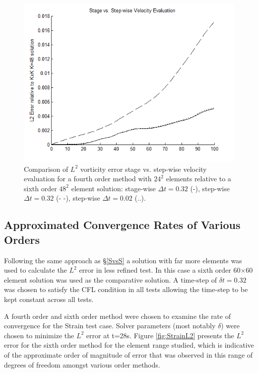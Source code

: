 \documentclass[letterpaper,12pt]{report}
\begin{document}
\begin{figure}
\centering
\includegraphics[width=1\textwidth]{StrainStageVSStep.PNG}
\caption{\label{fig:StrainStageVSStep}Comparison of $L^2$ vorticity error stage vs. step-wise velocity evaluation for a fourth order method with $24^2$ elements relative to a sixth order $48^2$ element solution: stage-wise $\Delta t=0.32$ (-), step-wise $\Delta t=0.32$ (- -), step-wise $\Delta t=0.02$ (..). }
\end{figure}
%
\subsection{Approximated Convergence Rates of Various Orders}\label{SConverge}
Following the same approach as \S\ref{SvsS} a solution with far more elements was used to calculate the $L^2$ error in less refined test. In this case a sixth order 60$\times$60 element solution was used as the comparative solution. A time-step of $\delta t=0.32$ was chosen to satisfy the CFL condition in all tests allowing the time-step to be kept constant across all tests.

A fourth order and sixth order method were chosen to examine the rate of convergence for the Strain test case. Solver parameters (most notably $\delta$) were chosen to minimize the $L^2$ error at t=28s. Figure \ref{fig:StrainL2} presents the $L^2$ error for the sixth order method for the element range studied, which is indicative of the approximate order of magnitude of error that was observed in this range of degrees of freedom amongst various order methods.
\end{document}
